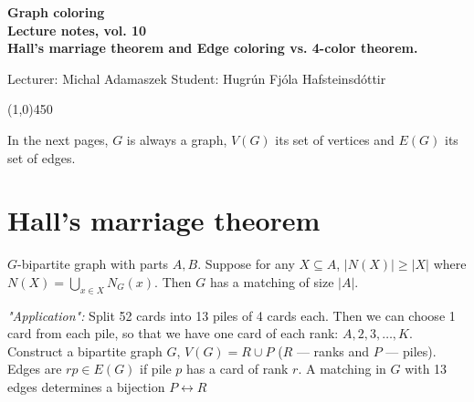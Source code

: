 \documentclass[a4paper]{article}
\theoremstyle{plain}
\theoremstyle{myremark}
\newtheorem{remark}[lemma]{Remark}
\begin{document}
\thispagestyle{empty}

\begin{center}
	{\Large\bf Graph coloring}\\
	{\bf Lecture notes, vol. 10 \\ Hall's marriage theorem and Edge coloring vs. 4-color theorem.}\\
\end{center}
Lecturer: Michal Adamaszek \hfill Student: Hugr\'un Fj\'ola Hafsteinsd\'ottir
\begin{center}
\line(1,0){450}
\end{center}


In the next pages, $G$ is always a graph, $V(G)$ its set of vertices and $E(G)$ its set of edges. 


\section*{Hall's marriage theorem}
$G$-bipartite graph with parts $A,B$. Suppose for any $X\subseteq A$, $|N(X)|\geq |X|$ where $N(X)=\bigcup_{x\in X}N_G(x)$. Then $G$ has a matching of size $|A|$.

\emph{"Application":} Split 52 cards into 13 piles of 4 cards each. Then we can choose 1 card from each pile, so that we have one card of each rank: $A,2,3,\dots,K$. Construct a bipartite graph $G$, $V(G)=R\cup P$ ($R$ --- ranks and $P$ --- piles). Edges are $rp\in E(G)$ if pile $p$ has a card of rank $r$. A matching in $G$ with 13 edges determines a bijection $P\longleftrightarrow R$
\end{document}
